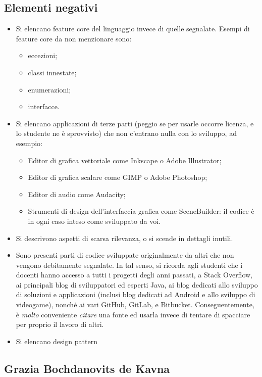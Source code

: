 \documentclass[a4paper,12pt]{report}
\begin{document}
\subsection*{Elementi negativi}
\begin{itemize}
	\item Si elencano feature core del linguaggio invece di quelle segnalate. Esempi di feature core da non menzionare sono:
    \begin{itemize}
        \item eccezioni;
        \item classi innestate;
        \item enumerazioni;
        \item interfacce.
    \end{itemize}
	\item Si elencano applicazioni di terze parti (peggio se per usarle occorre licenza, e lo studente ne è sprovvisto) che non c'entrano nulla con lo sviluppo, ad esempio:
    \begin{itemize}
        \item Editor di grafica vettoriale come Inkscape o Adobe Illustrator;
        \item Editor di grafica scalare come GIMP o Adobe Photoshop;
        \item Editor di audio come Audacity;
        \item Strumenti di design dell'interfaccia grafica come SceneBuilder: il codice è in ogni caso inteso come sviluppato da voi.
    \end{itemize}
	\item Si descrivono aspetti di scarsa rilevanza, o si scende in dettagli inutili.
	\item Sono presenti parti di codice sviluppate originalmente da altri che non vengono debitamente segnalate.
	In tal senso, si ricorda agli studenti che i docenti hanno accesso a tutti i progetti degli anni passati,
	a Stack Overflow,
	ai principali blog di sviluppatori ed esperti Java,
	ai blog dedicati allo sviluppo di soluzioni e applicazioni
	(inclusi blog dedicati ad Android e allo sviluppo di videogame),
	nonché ai vari GitHub, GitLab, e Bitbucket.
	Conseguentemente, è \emph{molto} conveniente \emph{citare} una fonte ed usarla invece di tentare di spacciare per proprio il lavoro di altri.
	\item Si elencano design pattern
\end{itemize}

\subsection{Grazia Bochdanovits de Kavna}
\end{document}
